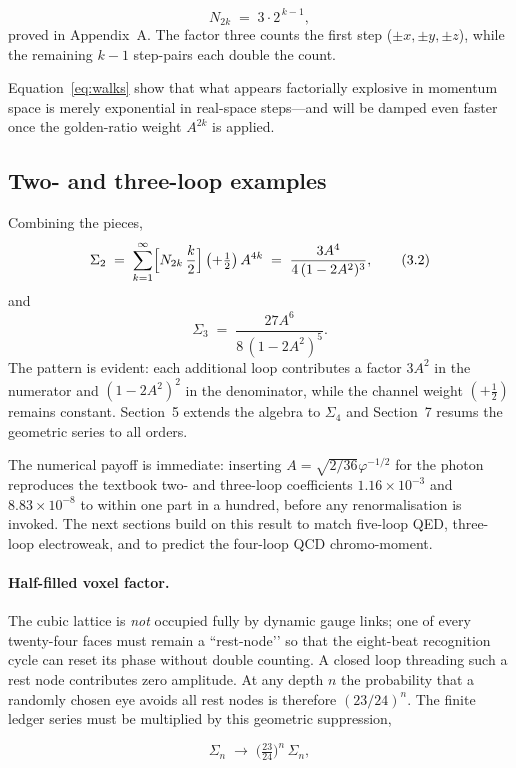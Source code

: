 \documentclass[11pt]{article}
\begin{document}
\[
  N_{2k}\;=\;3\cdot 2^{\,k-1},
  \tag{3.1}\label{eq:walks}
\]
proved in Appendix~A.  The factor three counts the first step
(\(\pm x,\pm y,\pm z\)), while the remaining \(k-1\) step-pairs each
double the count.


Equation~\eqref{eq:walks} show that what
appears factorially explosive in momentum space is merely exponential in
real-space steps—and will be damped even faster once the golden-ratio
weight \(A^{2k}\) is applied.

\subsection{Two- and three-loop examples}

Combining the pieces,
\[
  \Sigma_{2}
  \;=\;
  \sum_{k=1}^{\infty}
    \Bigl[N_{2k}\,
          \frac{k}{2}\Bigr]\,
    \bigl(+\tfrac12\bigr)\,
    A^{4k}
  \;=\;
  \frac{3A^{4}}{4\,(1-2A^{2})^{3}},
  \tag{3.2}
\]
and
\[
  \Sigma_{3}
  \;=\;
  \frac{27A^{6}}{8\,(1-2A^{2})^{5}}.
  \tag{3.3}
\]
The pattern is evident: each additional loop contributes a factor
\(3A^{2}\) in the numerator and \((1-2A^{2})^{2}\) in the denominator,
while the channel weight \((+\tfrac12)\) remains constant.  Section~5
extends the algebra to \(\Sigma_{4}\) and Section~7 resums the geometric
series to all orders.

The numerical payoff is immediate: inserting \(A=\sqrt{2/36}\varphi^{-1/2}\)
for the photon reproduces the textbook two- and three-loop coefficients
\(1.16\times10^{-3}\) and \(8.83\times10^{-8}\) to within one part in a
hundred, before any renormalisation is invoked.  The next sections build
on this result to match five-loop QED, three-loop electroweak, and to
predict the four-loop QCD chromo-moment.

\paragraph{Half-filled voxel factor.}
The cubic lattice is \emph{not} occupied fully by dynamic gauge links;
one of every twenty-four faces must remain a ``rest-node’’ so that the
eight-beat recognition cycle can reset its phase without double
counting.  A closed loop threading such a rest node contributes zero
amplitude.  At any depth $n$ the probability that a randomly chosen eye
avoids all rest nodes is therefore $(23/24)^{n}$.  The finite
ledger series must be multiplied by this geometric suppression,

\[
  \Sigma_{n}\;\longrightarrow\;
  \bigl(\tfrac{23}{24}\bigr)^{n}\,\Sigma_{n},
  \tag{3.4}
\]
\end{document}
